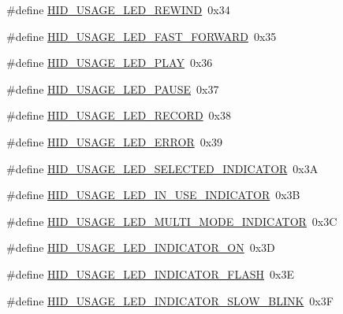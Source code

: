 \begin{DoxyCompactItemize}
\item 
\#define \hyperlink{group___u_s_b_d___h_i_d_ga18ef8eb8f894def11e7bcbea1eddcbe3}{H\+I\+D\+\_\+\+U\+S\+A\+G\+E\+\_\+\+L\+E\+D\+\_\+\+R\+E\+W\+I\+ND}~0x34
\item 
\#define \hyperlink{group___u_s_b_d___h_i_d_ga3a4a93c2db00474a8353a653457462ac}{H\+I\+D\+\_\+\+U\+S\+A\+G\+E\+\_\+\+L\+E\+D\+\_\+\+F\+A\+S\+T\+\_\+\+F\+O\+R\+W\+A\+RD}~0x35
\item 
\#define \hyperlink{group___u_s_b_d___h_i_d_ga0e1d5a888297641ba60e0d339384b6e3}{H\+I\+D\+\_\+\+U\+S\+A\+G\+E\+\_\+\+L\+E\+D\+\_\+\+P\+L\+AY}~0x36
\item 
\#define \hyperlink{group___u_s_b_d___h_i_d_ga661f4369dd90713ad94634190e4e0014}{H\+I\+D\+\_\+\+U\+S\+A\+G\+E\+\_\+\+L\+E\+D\+\_\+\+P\+A\+U\+SE}~0x37
\item 
\#define \hyperlink{group___u_s_b_d___h_i_d_ga75cd4f041b28d055b64f127c45d5c1a6}{H\+I\+D\+\_\+\+U\+S\+A\+G\+E\+\_\+\+L\+E\+D\+\_\+\+R\+E\+C\+O\+RD}~0x38
\item 
\#define \hyperlink{group___u_s_b_d___h_i_d_gacf4628b5d2ec9d62ac2fe7e73d58c692}{H\+I\+D\+\_\+\+U\+S\+A\+G\+E\+\_\+\+L\+E\+D\+\_\+\+E\+R\+R\+OR}~0x39
\item 
\#define \hyperlink{group___u_s_b_d___h_i_d_ga3eab7def711983efe709356bb64ee3f7}{H\+I\+D\+\_\+\+U\+S\+A\+G\+E\+\_\+\+L\+E\+D\+\_\+\+S\+E\+L\+E\+C\+T\+E\+D\+\_\+\+I\+N\+D\+I\+C\+A\+T\+OR}~0x3A
\item 
\#define \hyperlink{group___u_s_b_d___h_i_d_ga5989c594ce7bfd94817de1ac6ed8c291}{H\+I\+D\+\_\+\+U\+S\+A\+G\+E\+\_\+\+L\+E\+D\+\_\+\+I\+N\+\_\+\+U\+S\+E\+\_\+\+I\+N\+D\+I\+C\+A\+T\+OR}~0x3B
\item 
\#define \hyperlink{group___u_s_b_d___h_i_d_ga839ad385878569f6a9d3b90d8a38cb14}{H\+I\+D\+\_\+\+U\+S\+A\+G\+E\+\_\+\+L\+E\+D\+\_\+\+M\+U\+L\+T\+I\+\_\+\+M\+O\+D\+E\+\_\+\+I\+N\+D\+I\+C\+A\+T\+OR}~0x3C
\item 
\#define \hyperlink{group___u_s_b_d___h_i_d_ga48aae293742fcfc360e51a3a15fde96a}{H\+I\+D\+\_\+\+U\+S\+A\+G\+E\+\_\+\+L\+E\+D\+\_\+\+I\+N\+D\+I\+C\+A\+T\+O\+R\+\_\+\+ON}~0x3D
\item 
\#define \hyperlink{group___u_s_b_d___h_i_d_ga4f1b587abec632b31d8635c75b43a803}{H\+I\+D\+\_\+\+U\+S\+A\+G\+E\+\_\+\+L\+E\+D\+\_\+\+I\+N\+D\+I\+C\+A\+T\+O\+R\+\_\+\+F\+L\+A\+SH}~0x3E
\item 
\#define \hyperlink{group___u_s_b_d___h_i_d_ga5f0a0abd6759a915a89997b1d7fe006f}{H\+I\+D\+\_\+\+U\+S\+A\+G\+E\+\_\+\+L\+E\+D\+\_\+\+I\+N\+D\+I\+C\+A\+T\+O\+R\+\_\+\+S\+L\+O\+W\+\_\+\+B\+L\+I\+NK}~0x3F

\end{DoxyCompactItemize}
